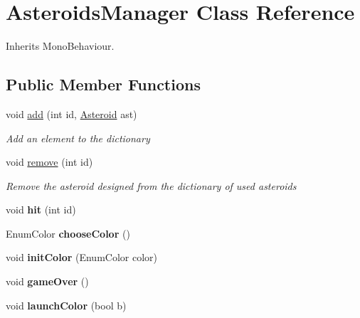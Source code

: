 \hypertarget{class_asteroids_manager}{\section{Asteroids\-Manager Class Reference}
\label{class_asteroids_manager}
}


Inherits Mono\-Behaviour.

\subsection*{Public Member Functions}
\begin{DoxyCompactItemize}
\item 
void \hyperlink{class_asteroids_manager_a7461d4869a094b6675f9ba96e9717b5b}{add} (int id, \hyperlink{class_asteroid}{Asteroid} ast)
\begin{DoxyCompactList}\small\item\em Add an element to the dictionary \end{DoxyCompactList}\item 
void \hyperlink{class_asteroids_manager_ae456b5ff0424dfcd54a48b60bdf07cda}{remove} (int id)
\begin{DoxyCompactList}\small\item\em Remove the asteroid designed from the dictionary of used asteroids \end{DoxyCompactList}\item 
\hypertarget{class_asteroids_manager_ae074fa2cdfeea39ba1b82eb95eda6cb6}{void {\bfseries hit} (int id)}\label{class_asteroids_manager_ae074fa2cdfeea39ba1b82eb95eda6cb6}

\item 
\hypertarget{class_asteroids_manager_afb9480d388577f0faf201ef049bc1165}{Enum\-Color {\bfseries choose\-Color} ()}\label{class_asteroids_manager_afb9480d388577f0faf201ef049bc1165}

\item 
\hypertarget{class_asteroids_manager_a26a07f85aef960abab488fe9494cdad1}{void {\bfseries init\-Color} (Enum\-Color color)}\label{class_asteroids_manager_a26a07f85aef960abab488fe9494cdad1}

\item 
\hypertarget{class_asteroids_manager_a4519c425661a7e87fd34ba8fb77cd0df}{void {\bfseries game\-Over} ()}\label{class_asteroids_manager_a4519c425661a7e87fd34ba8fb77cd0df}

\item 
\hypertarget{class_asteroids_manager_a652d9f56ce0609299745ec55b5115899}{void {\bfseries launch\-Color} (bool b)}\label{class_asteroids_manager_a652d9f56ce0609299745ec55b5115899}

\end{DoxyCompactItemize}
